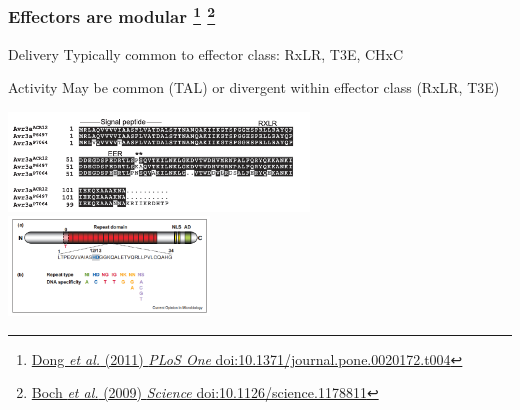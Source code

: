 \begin{frame}
\begin{center}
  \end{center}
\end{frame}

\begin{frame}
  \frametitle{Effectors are modular
  \footnote{\tiny{\href{http://dx.doi.org/10.1371/journal.pone.0020172.t004}{Dong \textit{et al.} (2011) \textit{PLoS One} doi:10.1371/journal.pone.0020172.t004}}}
  \footnote{\tiny{\href{http://dx.doi.org/10.1126/science.1178811}{Boch \textit{et al.} (2009) \textit{Science} doi:10.1126/science.1178811}}}
  }
  \begin{footnotesize}
    \begin{alertblock}{Delivery}
      Typically common to effector class: RxLR, T3E, CHxC
    \end{alertblock}
    \begin{block}{Activity}
      May be common (TAL) or divergent within effector class (RxLR, T3E)
    \end{block}  
  \end{footnotesize}
  \begin{center}
    \includegraphics[width=0.6\textwidth,valign=t]{images/modular_rxlr_dong_et_al_2011}    
    \includegraphics[width=0.4\textwidth,valign=t]{images/modular_tal_scholze_et_al_2011}        
  \end{center}
\end{frame}


